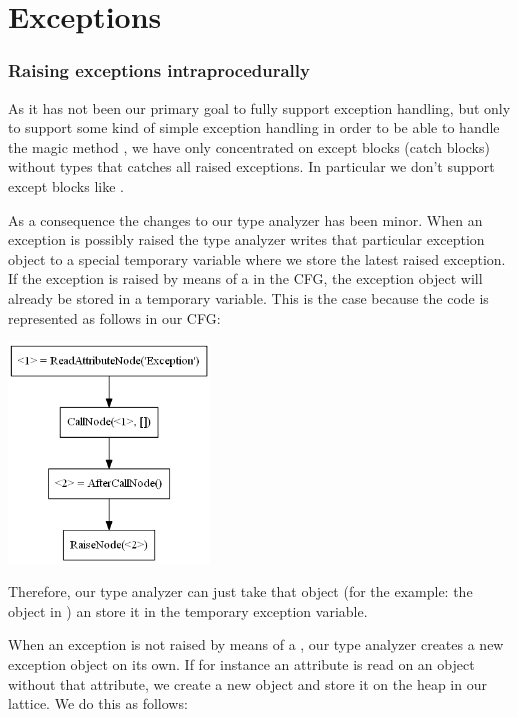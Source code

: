 \chapter{Exceptions}
\subsection{Raising exceptions intraprocedurally}
As it has not been our primary goal to fully support exception handling, but only to support some kind of simple exception handling in order to be able to handle the magic method , we have only concentrated on except blocks (catch blocks) without types that catches all raised exceptions. In particular we don't support except blocks like .

As a consequence the changes to our type analyzer has been minor. When an exception is possibly raised the type analyzer writes that particular exception object to a special temporary variable where we store the latest raised exception. If the exception is raised by means of a  in the CFG, the exception object will already be stored in a temporary variable. This is the case because the code  is represented as follows in our CFG:

\begin{listing}[H]
	\begin{center}
		\includegraphics[width=0.4\textwidth]{images/raiseexception.png}
	\end{center}
	\vspace{-20pt}
\end{listing}

Therefore, our type analyzer can just take that object (for the example: the object in ) an store it in the temporary exception variable.

When an exception is not raised by means of a , our type analyzer creates a new exception object on its own. If for instance an attribute is read on an object without that attribute, we create a new  object and store it on the heap in our lattice. We do this as follows:

